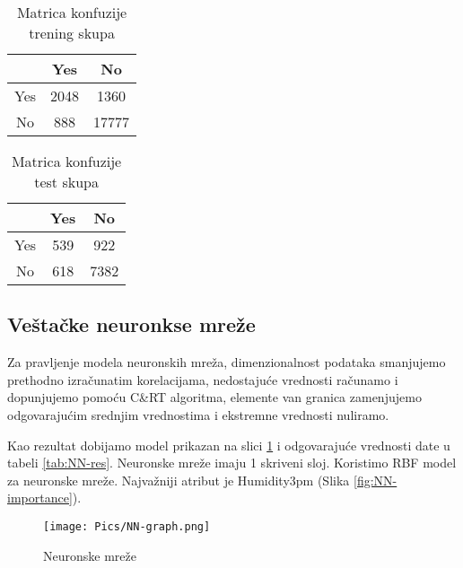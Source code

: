 \documentclass[a4paper]{article}
\begin{document}
        \begin{table}[H]
        \begin{center}
        \caption{Matrica konfuzije trening skupa}
        \label{tab:KNN-py-train-CM}
        \begin{tabular}{|c|c|c|} \hline
        \textbf{} & \textbf{Yes} & \textbf{No} \\ \hline
        Yes & 2048  &1360  \\ \hline
        No & 888  &17777 \\ \hline
        \end{tabular}
        \end{center}
        \end{table}
        
        \begin{table}[H]
        \begin{center}
        \caption{Matrica konfuzije test skupa}
        \label{tab:KNN-py-test-CM}
        \begin{tabular}{|c|c|c|} \hline
        \textbf{} & \textbf{Yes} & \textbf{No} \\ \hline
        Yes & 539 & 922 \\ \hline
        No & 618 & 7382 \\ \hline
        \end{tabular}
        \end{center}
        \end{table}
        

\subsection{Veštačke neuronkse mreže}
\label{NN}
Za pravljenje modela neuronskih mreža, dimenzionalnost podataka smanjujemo prethodno izračunatim korelacijama, nedostajuće vrednosti računamo i dopunjujemo pomoću C\&RT algoritma, elemente van granica zamenjujemo odgovarajućim srednjim vrednostima i ekstremne vrednosti nuliramo.

Kao rezultat dobijamo model prikazan na slici \ref{fig:NN-graph} i odgovarajuće vrednosti date u tabeli \ref{tab:NN-res}. Neuronske mreže imaju 1 skriveni sloj. Koristimo RBF model za neuronske mreže. Najvažniji atribut je Humidity3pm (Slika \ref{fig:NN-importance}).

\begin{figure}[H]
     \centering
     \texttt{[image: Pics/NN-graph.png]}
     \caption{Neuronske mreže}
     \label{fig:NN-graph}
\end{figure}
\end{document}

